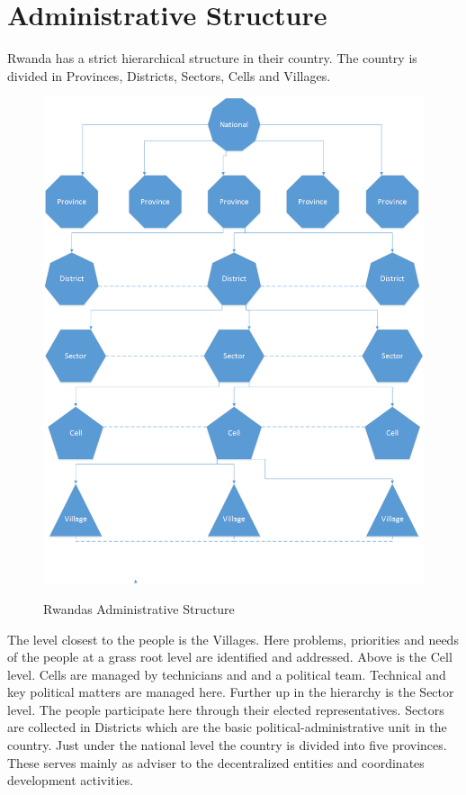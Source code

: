 \section{Administrative Structure}
Rwanda has a strict hierarchical structure in their country. The country is divided in Provinces, Districts, Sectors, Cells and Villages.

\begin{figure}
\centering
\includegraphics[width=\textwidth]{context/img/adminStructure}
\label{rwanda_admin_structure}
\caption{Rwandas Administrative Structure}
\end{figure}

The level closest to the people is the Villages. 
Here problems, priorities and needs of the people at a grass root level are identified and addressed. 
Above is the Cell level. 
Cells are managed by technicians and and a political team. 
Technical and key political matters are managed here. 
Further up in the hierarchy is the Sector level. 
The people participate here through their elected representatives. 
Sectors are collected in Districts which are the basic political-administrative unit in the country. 
Just under the national level the country is divided into five provinces. 
These serves mainly as adviser to the decentralized entities and coordinates development activities. \cite{mlg:admin}

